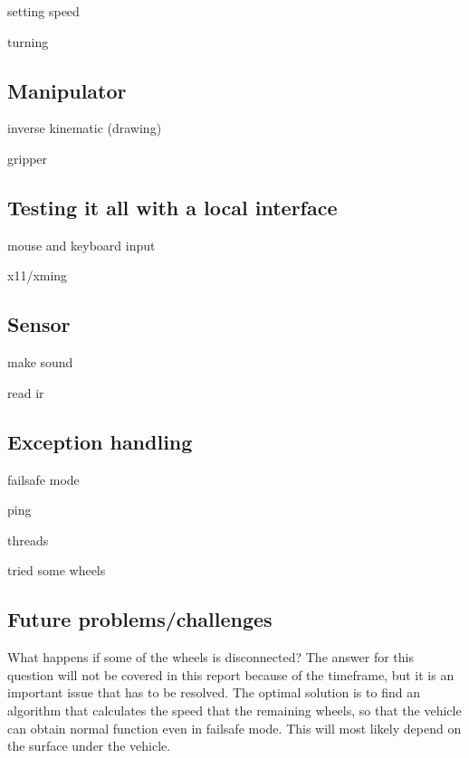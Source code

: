 setting speed

turning 

\subsection{Manipulator}

inverse kinematic (drawing)

gripper

\subsection{Testing it all with a local interface}

mouse and keyboard input

x11/xming

\subsection{Sensor}

make sound

read ir

\subsection{Exception handling}

failsafe mode

ping

threads

tried some wheels

\subsection{Future problems/challenges}
What happens if some of the wheels is disconnected? 
The answer for this question will not be covered in this report because of the timeframe, but it is an important issue that has to be resolved. 
The optimal solution is to find an algorithm that calculates the speed that the remaining wheels, so that the vehicle can obtain normal function even in failsafe mode. 
This will most likely depend on the surface under the vehicle. 


